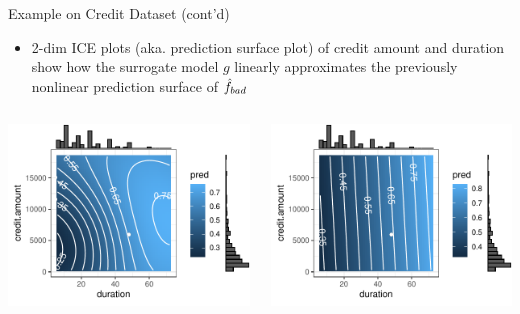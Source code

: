 \documentclass[11pt,compress,t,notes=noshow, aspectratio=169, xcolor=table]{beamer}
\newcommand{\pih}{\fh}
\begin{document}
\begin{frame}[c]{Example on Credit Dataset (cont'd)}

\begin{itemize}	
	\item 2-dim ICE plots (aka. prediction surface plot) of credit amount and duration show how the surrogate model $g$ linearly approximates the previously nonlinear prediction surface of $\pih_{bad}$ 
\end{itemize}
\vspace{-0.4cm}
 \begin{columns}[totalwidth=\textwidth]
	\begin{column}{0.47\textwidth}
		\begin{center}
		\includegraphics[width=1\textwidth]{figure/lime_credit_ice1.pdf}
		\end{center}		
	\end{column}
	\begin{column}{0.46\textwidth}  
		\begin{center}
				\includegraphics[width=1\textwidth]{figure/lime_credit_ice2.pdf}
		\end{center}
			

\end{column}
\end{columns}
\end{frame}
\end{document}
